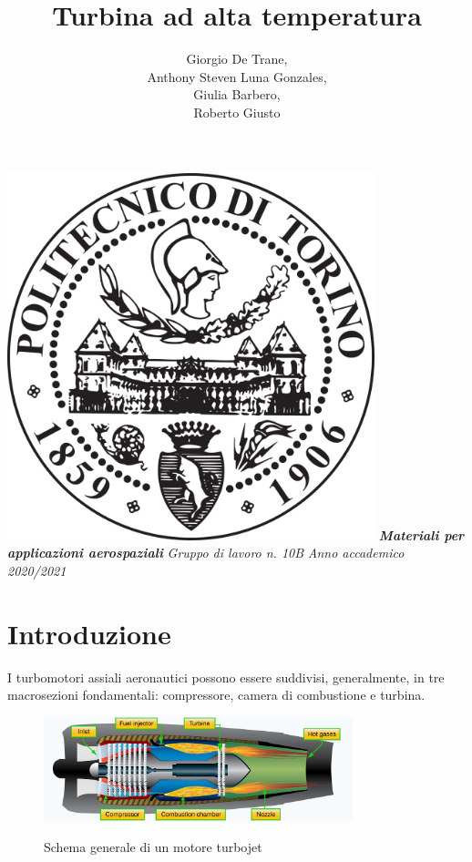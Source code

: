 \documentclass{article}
\author{Giorgio De Trane, \\Anthony Steven Luna Gonzales, \\Giulia Barbero, \\Roberto Giusto}
\title{\textbf{Turbina ad alta temperatura}}
\begin{document}
    \setlength{\parindent}{0pt}
    \maketitle
    \begin{center}
        \includegraphics[width=0.8\textwidth]{Sources/polito_logo.png}\linebreak\newline
       \textbf{\textit{Materiali per applicazioni aerospaziali}}\linebreak\newline
        \textit{Gruppo di lavoro n. 10B}\linebreak\newline
        \textit{Anno accademico 2020/2021}
    \end{center}

    \newpage
    \tableofcontents
    \newpage
    \section{Introduzione\label{Intro}}
    I turbomotori assiali aeronautici possono essere suddivisi, generalmente, in tre macrosezioni
    fondamentali: compressore, camera di combustione e turbina.\\

    \begin{figure}[h!]
        \centering
        \includegraphics[width=0.8\textwidth]{Sources/turbojet.png}\\
    \caption{Schema generale di un motore turbojet \autocite*{turbojet}} 
    \end{figure}
\end{document}
